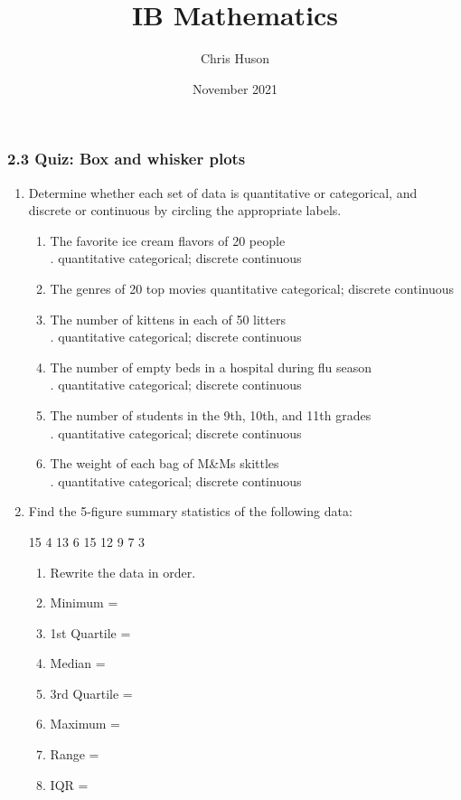 \documentclass[12pt, twoside]{article}
\title{IB Mathematics}
\author{Chris Huson}
\date{November 2021}
\begin{document}
\subsubsection*{2.3 Quiz: Box and whisker plots}
\begin{enumerate}
\item Determine whether each set of data is quantitative or categorical, and discrete or continuous by circling the appropriate labels.
  \begin{enumerate}[itemsep=0.5cm]
    \item The favorite ice cream flavors of 20 people\\. \hfill quantitative categorical; discrete continuous
    \item The genres of 20 top movies \hfill quantitative categorical; discrete continuous
    \item The number of kittens in each of 50 litters\\. \hfill quantitative categorical; discrete continuous
    \item The number of empty beds in a hospital during flu season\\. \hfill quantitative categorical; discrete continuous
    \item The number of students in the 9th, 10th, and 11th grades\\.  \hfill quantitative categorical; discrete continuous
    \item The weight of each bag of M\&Ms skittles\\. \hfill quantitative categorical; discrete continuous
  \end{enumerate} \vspace{0.5cm}

\item Find the 5-figure summary statistics of the following data:
  \begin{center}
  15 4 13 6 15 12 9 7 3
  \end{center}
  \begin{enumerate}[itemsep=0.7cm]
    \item Rewrite the data in order.
    \item Minimum =
    \item 1st Quartile =
    \item Median =
    \item 3rd Quartile =
    \item Maximum =
    \item Range =
    \item IQR =
  \end{enumerate} \vspace{0.5cm}


\end{enumerate}
\end{document}
